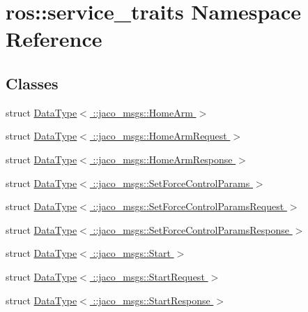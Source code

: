 \hypertarget{namespaceros_1_1service__traits}{}\section{ros\+:\+:service\+\_\+traits Namespace Reference}
\label{namespaceros_1_1service__traits}
\subsection*{Classes}
\begin{DoxyCompactItemize}
\item 
struct \hyperlink{structros_1_1service__traits_1_1DataType_3_01_1_1jaco__msgs_1_1HomeArm_01_4}{Data\+Type$<$ \+::jaco\+\_\+msgs\+::\+Home\+Arm $>$}
\item 
struct \hyperlink{structros_1_1service__traits_1_1DataType_3_01_1_1jaco__msgs_1_1HomeArmRequest_01_4}{Data\+Type$<$ \+::jaco\+\_\+msgs\+::\+Home\+Arm\+Request $>$}
\item 
struct \hyperlink{structros_1_1service__traits_1_1DataType_3_01_1_1jaco__msgs_1_1HomeArmResponse_01_4}{Data\+Type$<$ \+::jaco\+\_\+msgs\+::\+Home\+Arm\+Response $>$}
\item 
struct \hyperlink{structros_1_1service__traits_1_1DataType_3_01_1_1jaco__msgs_1_1SetForceControlParams_01_4}{Data\+Type$<$ \+::jaco\+\_\+msgs\+::\+Set\+Force\+Control\+Params $>$}
\item 
struct \hyperlink{structros_1_1service__traits_1_1DataType_3_01_1_1jaco__msgs_1_1SetForceControlParamsRequest_01_4}{Data\+Type$<$ \+::jaco\+\_\+msgs\+::\+Set\+Force\+Control\+Params\+Request $>$}
\item 
struct \hyperlink{structros_1_1service__traits_1_1DataType_3_01_1_1jaco__msgs_1_1SetForceControlParamsResponse_01_4}{Data\+Type$<$ \+::jaco\+\_\+msgs\+::\+Set\+Force\+Control\+Params\+Response $>$}
\item 
struct \hyperlink{structros_1_1service__traits_1_1DataType_3_01_1_1jaco__msgs_1_1Start_01_4}{Data\+Type$<$ \+::jaco\+\_\+msgs\+::\+Start $>$}
\item 
struct \hyperlink{structros_1_1service__traits_1_1DataType_3_01_1_1jaco__msgs_1_1StartRequest_01_4}{Data\+Type$<$ \+::jaco\+\_\+msgs\+::\+Start\+Request $>$}
\item 
struct \hyperlink{structros_1_1service__traits_1_1DataType_3_01_1_1jaco__msgs_1_1StartResponse_01_4}{Data\+Type$<$ \+::jaco\+\_\+msgs\+::\+Start\+Response $>$}
\item 

\end{DoxyCompactItemize}

